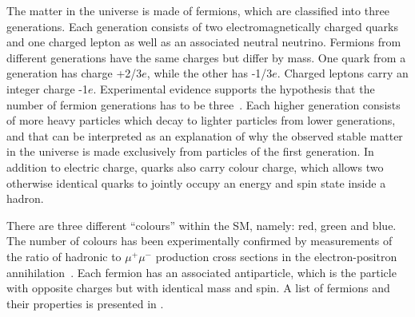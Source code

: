 The matter in the universe is made of fermions, which are classified into three generations.
Each generation consists of two electromagnetically charged quarks and one charged lepton as well as an associated neutral neutrino.
Fermions from different generations have the same charges but differ by mass.
One quark from a generation has charge +2/3$e$, while the other has -1/3$e$. Charged leptons carry an integer charge -1$e$.
Experimental evidence supports the hypothesis that the number of fermion generations has to be three~\cite{three_lepton_generations}.
Each higher generation consists of more heavy particles which decay to lighter particles from lower generations, and that can be
interpreted as an explanation of 
why the observed stable matter in the universe is made exclusively from particles of the first generation.
In addition to electric charge, quarks also carry colour charge, which allows two otherwise identical quarks to jointly occupy an energy and spin state inside a hadron.

There are three different ``colours'' within the SM, namely: red, green and blue.
The number of colours has been experimentally confirmed by measurements of the 
ratio of hadronic to $\mu^+\mu^-$ production cross sections
in the electron-positron annihilation~\cite{pdg_2014}. 
Each fermion has an associated antiparticle, which is the particle with opposite charges but with identical mass and spin.
A list of fermions and their properties is presented in .

